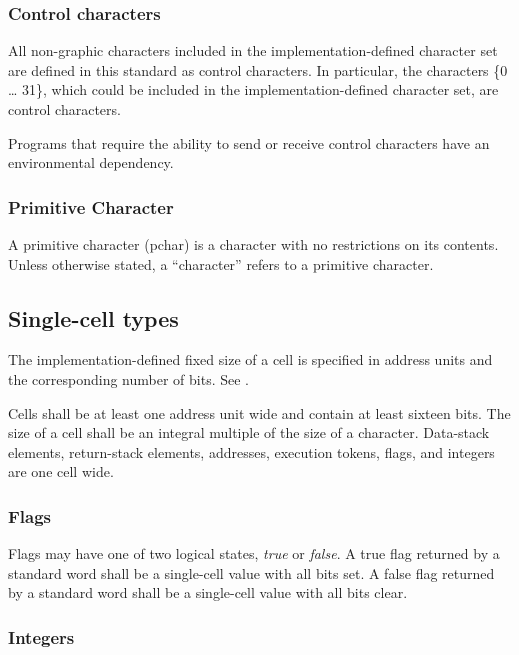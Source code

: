 \subsubsection{Control characters} %
\label{usage:control}

All non-graphic characters included in the implementation-defined
character set are defined in this standard as control characters.
In particular, the characters \{0 {\ldots} 31\}, which could be
included in the im\-ple\-ment\-ation-de\-fined character set, are control
characters.

Programs that require the ability to send or receive control
characters have an environmental dependency.

\subsubsection{Primitive Character} %
\label{usage:pchar}

A primitive character (pchar) is a character with no restrictions on
its contents.  Unless otherwise stated, a ``character'' refers to a
primitive character.

\subsection{Single-cell types} %
\label{usage:cell}

The implementation-defined fixed size of a cell is specified in
address units and the corresponding number of bits.
See .

Cells shall be at least one address unit wide and contain at least
sixteen bits. The size of a cell shall be an integral multiple of
the size of a character. Data-stack elements, return-stack elements,
addresses, execution tokens, flags, and integers are one cell wide.

\subsubsection{Flags} %
\label{usage:flags}

Flags may have one of two logical states, \emph{true} or \emph{false}.
A true flag returned by a standard word shall be a
single-cell value with all bits set. A false flag returned by a
standard word shall be a single-cell value with all bits clear.

\subsubsection{Integers} %
\label{usage:int}

